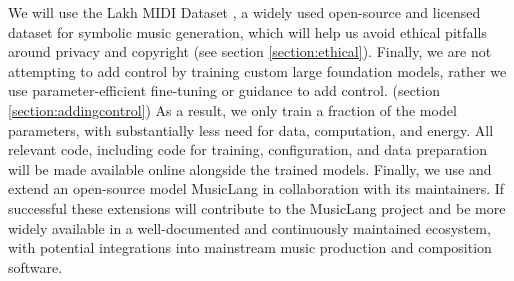 We will use the Lakh MIDI Dataset \cite{Raffel_2016}, a widely used open-source and licensed dataset for symbolic music generation, which will help us avoid ethical pitfalls around privacy and copyright (see section \ref{section:ethical}). Finally, we are not attempting to add control by training custom large foundation models, rather we use parameter-efficient fine-tuning or guidance to add control. (section \ref{section:addingcontrol}) As a result, we only train a fraction of the model parameters, with substantially less need for data, computation, and energy. All relevant code, including code for training, configuration, and data preparation will be made available online alongside the trained models. Finally, we use and extend an open-source model MusicLang in collaboration with its maintainers. If successful these extensions will contribute to the MusicLang project and be more widely available in a well-documented and continuously maintained ecosystem, with potential integrations into mainstream music production and composition software. 

